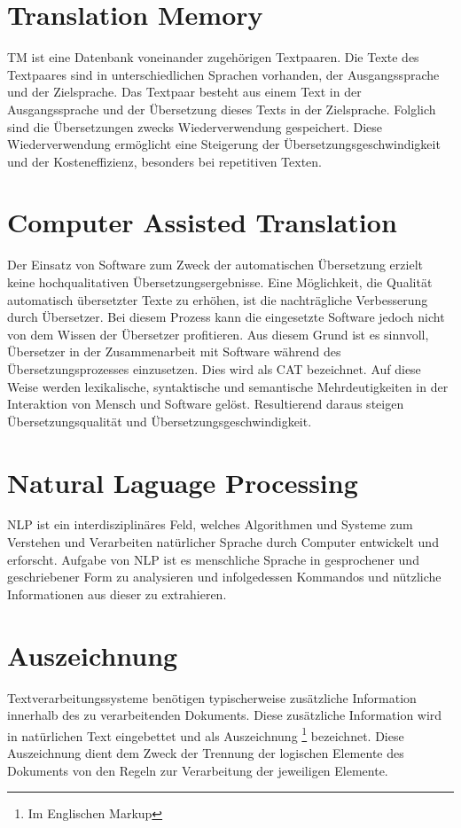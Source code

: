 \section{Translation Memory} 
\ac{TM} ist eine Datenbank voneinander zugehörigen Textpaaren. Die Texte des Textpaares sind in unterschiedlichen Sprachen vorhanden, der Ausgangssprache und der Zielsprache. Das Textpaar besteht aus einem Text in der Ausgangssprache und der Übersetzung dieses Texts in der Zielsprache. Folglich sind die Übersetzungen zwecks Wiederverwendung gespeichert. Diese Wiederverwendung ermöglicht eine Steigerung der Übersetzungsgeschwindigkeit und der Kosteneffizienz, besonders bei repetitiven Texten.
\autocite[Vgl.][S. 187]{OBrien.2010}
\section{Computer Assisted Translation}
Der Einsatz von Software zum Zweck der automatischen Übersetzung erzielt keine hochqualitativen Übersetzungsergebnisse. Eine Möglichkeit, die Qualität automatisch übersetzter Texte zu erhöhen, ist die nachträgliche Verbesserung durch Übersetzer. Bei diesem Prozess kann die eingesetzte Software jedoch nicht von dem Wissen der Übersetzer profitieren. Aus diesem Grund ist es sinnvoll, Übersetzer in der Zusammenarbeit mit Software während des Übersetzungsprozesses einzusetzen. Dies wird als \ac{CAT} bezeichnet. Auf diese Weise werden lexikalische, syntaktische und semantische Mehrdeutigkeiten in der Interaktion von Mensch und Software gelöst. Resultierend daraus steigen Übersetzungsqualität und Übersetzungsgeschwindigkeit.
\autocite[Vgl.][S. 4]{Barrachina.2009}
\section{Natural Laguage Processing}
\ac{NLP} ist ein interdisziplinäres Feld, welches Algorithmen und Systeme zum Verstehen und Verarbeiten natürlicher Sprache durch Computer entwickelt und erforscht. Aufgabe von \ac{NLP} ist es menschliche Sprache in gesprochener und geschriebener Form zu analysieren und infolgedessen Kommandos und nützliche Informationen aus dieser zu extrahieren.
\autocite[Vgl.][S. 135]{Sintoris.2017}
\section{Auszeichnung}
Textverarbeitungssysteme benötigen typischerweise zusätzliche Information innerhalb des zu verarbeitenden Dokuments. Diese zusätzliche Information wird in natürlichen Text eingebettet und als Auszeichnung 
\footnote{Im Englischen Markup}
bezeichnet. Diese Auszeichnung dient dem Zweck der Trennung der logischen Elemente des Dokuments von den Regeln zur Verarbeitung der jeweiligen Elemente.
\autocite[Vgl.][S. 1]{Ellison.1994}
